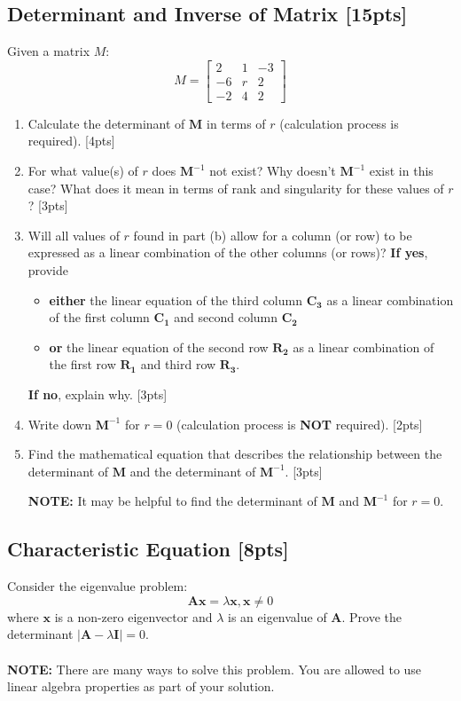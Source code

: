 \documentclass{article}
\begin{document}
\subsection{Determinant and Inverse of Matrix [15pts]}
Given a matrix $M$:
$$M = \begin{bmatrix} 
    2 & 1 & -3 \\ 
    -6 & r & 2 \\
    -2 & 4 & 2
\end{bmatrix}$$
\begin{enumerate}[label=(\alph*)]
    \item Calculate the determinant of $\boldsymbol{M}$ in terms of $r$ (calculation process is required). [4pts]
    \item For what value(s) of $r$ does $\boldsymbol{M}^{-1}$ not exist? Why doesn't $\boldsymbol{M}^{-1}$ exist in this case? What does it mean in terms of rank and singularity for these values of $r$? [3pts]
    \item Will all values of $r$ found in part (b) allow for a column (or row) to be expressed as a linear combination of the other columns (or rows)? \textbf{If yes}, provide
    \begin{itemize}
        \item \textbf{either} the linear equation of the third column $\boldsymbol{C_3}$ as a linear combination of the first column $\boldsymbol{C_1}$ and second column $\boldsymbol{C_2}$
        \item \textbf{or} the linear equation of the second row $\boldsymbol{R_2}$ as a linear combination of the first row $\boldsymbol{R_1}$ and third row $\boldsymbol{R_3}$.
    \end{itemize}
    \textbf{If no}, explain why. [3pts]
    \item Write down $\boldsymbol{M}^{-1}$ for $r = 0$ (calculation process is \textbf{NOT} required). [2pts]
    \item Find the mathematical equation that describes the relationship between the determinant of $\boldsymbol{M}$ and the determinant of $\boldsymbol{M}^{-1}$. [3pts]
    \par\textbf{NOTE:} It may be helpful to find the determinant of $\boldsymbol{M}$ and $\boldsymbol{M}^{-1}$ for $r = 0$.
\end{enumerate}





\subsection{Characteristic Equation [8pts]}
Consider the eigenvalue problem: 
$$\boldsymbol{Ax} =\lambda \boldsymbol{x}, \boldsymbol{x} \neq 0$$
where $\boldsymbol{x}$ is a non-zero eigenvector and $\lambda$ is an eigenvalue of $\boldsymbol{A}$. Prove the determinant $|\boldsymbol{A}-\lambda \boldsymbol{I}|= 0$.\\ \\
\textbf{NOTE:} There are many ways to solve this problem. You are allowed to use linear algebra properties as part of your solution. \\
\end{document}
